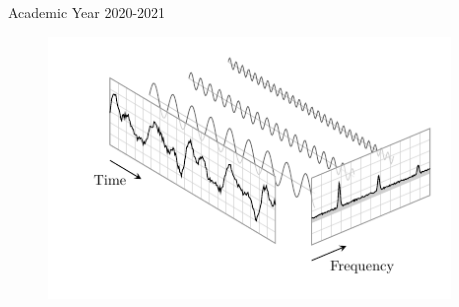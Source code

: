 \begin{titlepage}
	\vspace{0.5\baselineskip} %

	{\small Academic Year 2020-2021}

	\vspace*{5\baselineskip}

	\begin{figure}[!h]
		\centering
		\includegraphics[width=0.95\textwidth]{../frontespizio/F_images/fft.pdf}%
	\end{figure}

	\vfill %

%
%
%
%

\end{titlepage}

\clearpage{\pagestyle{empty}\cleardoublepage}
